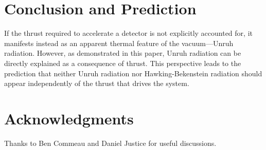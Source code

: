 \documentclass[12pt,a4paper]{article}
\begin{document}
\section{Conclusion and Prediction}
If the thrust required to accelerate a detector is not explicitly accounted for, it manifests instead as an apparent thermal feature of the vacuum—Unruh radiation. However, as demonstrated in this paper, Unruh radiation can be directly explained as a consequence of thrust. This perspective leads to the prediction that neither Unruh radiation nor Hawking-Bekenstein radiation should appear independently of the thrust that drives the system.

\section{Acknowledgments}
Thanks to Ben Commeau and Daniel Justice for useful discussions.



\end{document}
